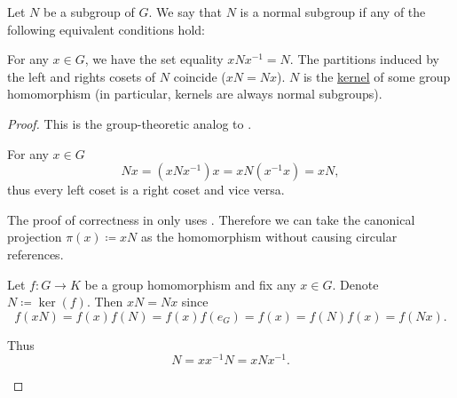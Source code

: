 \begin{definition}\label{def:normal_subgroup}
  Let \( N \) be a subgroup of \( G \). We say that \( N \) is a normal subgroup if any of the following equivalent conditions hold:
  \begin{defenum}
     For any \( x \in G \), we have the set equality \( x N x^{-1} = N \).
     The partitions induced by the left and rights cosets of \( N \) coincide (\( xN = Nx \)).
     \( N \) is the \hyperref[def:unital_magma_kernel]{kernel} of some group homomorphism (in particular, kernels are always normal subgroups).
  \end{defenum}
\end{definition}
\begin{proof}
  This is the group-theoretic analog to .

  \begin{description}
     For any \( x \in G \)
    \begin{equation*}
      Nx = (xNx^{-1})x = xN(x^{-1}x) = xN,
    \end{equation*}
    thus every left coset is a right coset and vice versa.

     The proof of correctness in  only uses . Therefore we can take the canonical projection \( \pi(x) \coloneqq xN \) as the homomorphism without causing circular references.

     Let \( f: G \to K \) be a group homomorphism and fix any \( x \in G \). Denote \( N \coloneqq \ker(f) \). Then \( xN = Nx \) since
    \begin{equation*}
      f(xN)
      =
      f(x) f(N)
      =
      f(x) f(e_G)
      =
      f(x)
      =
      f(N) f(x)
      =
      f(Nx).
    \end{equation*}

    Thus
    \begin{equation*}
      N = xx^{-1}N = xNx^{-1}.
    \end{equation*}
  \end{description}
\end{proof}

